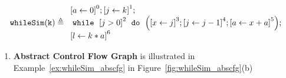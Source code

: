 \begin{example}
  \label{ex:whileSigle}
  $$
  \kw{whileSim(k)} \triangleq
    \begin{array}{l}
        \clabel{ \assign{a}{0}}^{0} ;   
              \clabel{\assign{j}{k} }^{1} ;\\
              \ewhile ~ \clabel{j > 0}^{2} ~ \edo ~ 
              \Big(
               \clabel{\assign{x}{j} }^{3}  ;
               \clabel{\assign{j}{j-1}}^{4} ;
              \clabel{\assign{a}{x + a}}^{5}  \Big);\\
              \clabel{\assign{l}{k * a} }^{6}
          \end{array}
  $$
\end{example}
  \begin{enumerate}
    \item  \textbf{Abstract Control Flow Graph}
    is illustrated in Example~\ref{ex:whileSim_abscfg} in Figure~\ref{fig:whileSim_abscfg}(b)
  

\end{enumerate}
